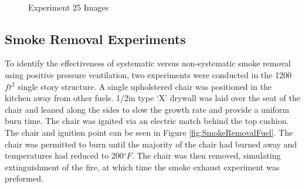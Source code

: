 \documentclass{article}
\begin{document}
\clearpage

\begin{figure}[H]
	\ContinuedFloat 
	\centering 
	 \ 
	\caption{Experiment 25 Images}
	\label{fig:Experiment25ImagesCont3} 
\end{figure}

\subsection{Smoke Removal Experiments}

To identify the effectiveness of systematic versus non-systematic smoke removal using positive pressure ventilation, two experiments were conducted in the 1200 $ft^2$ single story structure. A single upholstered chair was positioned in the kitchen away from other fuels. 1/2in type `X' drywall was laid over the seat of the chair and leaned along the sides to slow the growth rate and provide a uniform burn time. The chair was ignited via an electric match behind the top cushion. The chair and ignition point can be seen in Figure \ref{fig:SmokeRemovalFuel}. The chair was permitted to burn until the majority of the chair had burned away and temperatures had reduced to 200$^{\circ}F$. The chair was then removed, simulating extinguishment of the fire, at which time the smoke exhaust experiment was preformed. 
\end{document}
